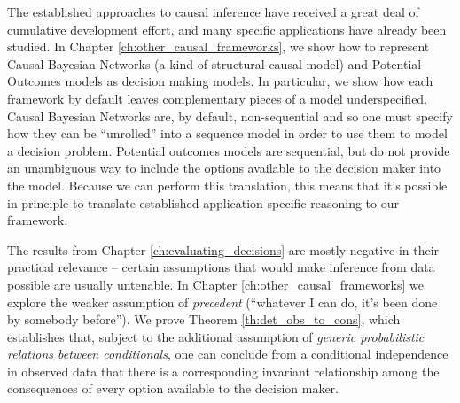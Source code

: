 The established approaches to causal inference have received a great deal of cumulative development effort, and many specific applications have already been studied. In Chapter \ref{ch:other_causal_frameworks}, we show how to represent Causal Bayesian Networks (a kind of structural causal model) and Potential Outcomes models as decision making models. In particular, we show how each framework by default leaves complementary pieces of a model underspecified. Causal Bayesian Networks are, by default, non-sequential and so one must specify how they can be ``unrolled'' into a sequence model in order to use them to model a decision problem. Potential outcomes models are sequential, but do not provide an unambiguous way to include the options available to the decision maker into the model. Because we can perform this translation, this means that it's possible in principle to translate established application specific reasoning to our framework.

The results from Chapter \ref{ch:evaluating_decisions} are mostly negative in their practical relevance -- certain assumptions that would make inference from data possible are usually untenable. In Chapter \ref{ch:other_causal_frameworks} we explore the weaker assumption of \emph{precedent} (``whatever I can do, it's been done by somebody before''). We prove Theorem \ref{th:det_obs_to_cons}, which establishes that, subject to the additional assumption of \emph{generic probabilistic relations between conditionals}, one can conclude from a conditional independence in observed data that there is a corresponding invariant relationship among the consequences of every option available to the decision maker. 


